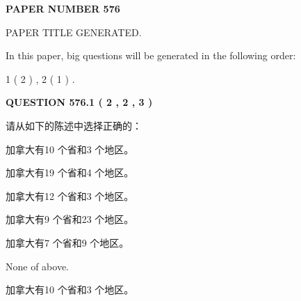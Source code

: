 \documentclass{ctexart}
\begin{document}
   
   
   
\newpage 
\setcounter{page}{ 
   576001 } 
   
   
   
   
 {\textbf{ \Large{ PAPER NUMBER  576  }}}
   
   
\vspace{0.2in}
   
   
   
   
   
   
   
   
 \vspace{0.2in}
 
 
 
 
   
   
 PAPER TITLE GENERATED.
   
   
   
\vspace{0.2in}
   
In this paper, big questions will be generated in the following order: 
   
   
   1 ( 2 )
 ,
   2 ( 1 )
 .
  
\vspace{0.2in}
  
{\textbf{\Large{QUESTION
576.1 
 ( 2 , 2 , 3 )
}}}
  
  
请从如下的陈述中选择正确的：
 
 
加拿大有10 个省和3 个地区。
 
 
加拿大有19 个省和4 个地区。
 
 
加拿大有12 个省和3 个地区。
 
 
加拿大有9 个省和23 个地区。
 
 
加拿大有7 个省和9 个地区。
 
 
 None of above.
 
 
\noindent{}
 
 
加拿大有10 个省和3 个地区。
 
 
\noindent{}
 
 
   
   
   
\end{document}
